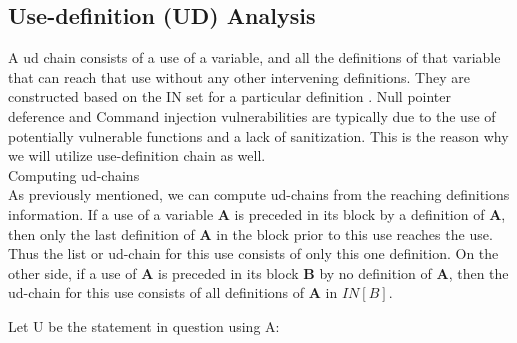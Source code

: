 
\subsection{Use-definition (UD) Analysis} %
\label{sec:Use_definition_Analysis}

A \gls{ud} chain consists of a use of a variable, and all the definitions of that variable that can reach that use without any other intervening definitions. They are constructed based on the IN set for a particular definition \cite{Kronjee2018}. Null pointer deference and Command injection vulnerabilities are typically due to the use of potentially vulnerable functions and a lack of sanitization. This is the reason why we will utilize use-definition chain as well.\\




{\Large Computing ud-chains} \\

As previously mentioned, we can  compute  ud-chains  from  the reaching definitions  information. If  a use  of a variable \textbf{A} is preceded in its block  by  a definition  of \textbf{A}, then  only  the last  definition of \textbf{A}  in the block  prior to this use  reaches  the use. Thus the list or ud-chain for this use  consists of only this one definition. On the other side, if a use of \textbf{A} is preceded  in its block \textbf{B} by no definition of \textbf{A}, then the ud-chain for this use consists of all definitions of \textbf{A} in \(IN[B]\).

Let U be the statement in question using A:

